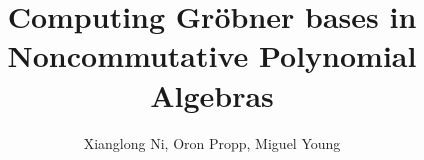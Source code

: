 \documentclass[10pt,a4paper]{amsart}
\begin{document}
	
	\title{Computing Gr\"obner bases in Noncommutative Polynomial Algebras}
	\author{Xianglong Ni, Oron Propp, Miguel Young }
	
	\maketitle
	
	\tableofcontents

    
    
    
    
    
    


    
	
\end{document}
